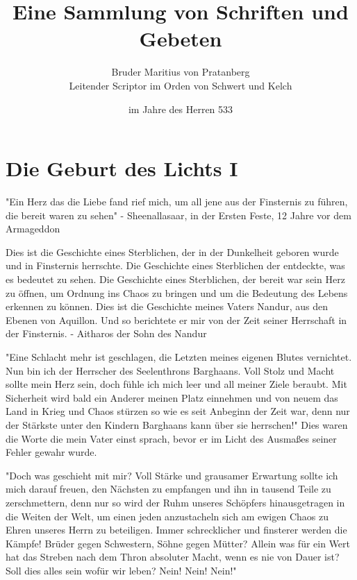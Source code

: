 \documentclass[10pt,twoside,BCOR=12mm,DIV=classic]{scrbook}
\begin{document}
\title{Eine Sammlung von Schriften und Gebeten}
\author{Bruder Maritius von Pratanberg\\Leitender Scriptor im Orden von Schwert und Kelch}
\date{im Jahre des Herren 533}

\maketitle
\tableofcontents

\chapter{Die Geburt des Lichts I}
"Ein Herz das die Liebe fand rief mich, um all jene aus der Finsternis zu führen,
die bereit waren zu sehen"
- Sheenallasaar, in der Ersten Feste, 12 Jahre vor dem Armageddon

Dies ist die Geschichte eines Sterblichen, der in der Dunkelheit geboren wurde
und in Finsternis herrschte. Die Geschichte eines Sterblichen der entdeckte, was
es bedeutet zu sehen. Die Geschichte eines Sterblichen, der bereit war sein
Herz zu öffnen, um Ordnung ins Chaos zu bringen und um die Bedeutung des
Lebens erkennen zu können. Dies ist die Geschichte meines Vaters Nandur, aus
den Ebenen von Aquillon. Und so berichtete er mir von der Zeit seiner
Herrschaft in der Finsternis.
- Aitharos der Sohn des Nandur

"Eine Schlacht mehr ist geschlagen, die Letzten meines eigenen Blutes
vernichtet. Nun bin ich der Herrscher des Seelenthrons Barghaans. Voll Stolz
und Macht sollte mein Herz sein, doch fühle ich mich leer und all meiner Ziele
beraubt. Mit Sicherheit wird bald ein Anderer meinen Platz einnehmen und von
neuem das Land in Krieg und Chaos stürzen so wie es seit Anbeginn der Zeit war,
denn nur der Stärkste unter den Kindern Barghaans kann über sie herrschen!" Dies
waren die Worte die mein Vater einst sprach, bevor er im Licht des Ausmaßes
seiner Fehler gewahr wurde.

"Doch was geschieht mit mir? Voll Stärke und grausamer Erwartung sollte ich mich
darauf freuen, den Nächsten zu empfangen und ihn in tausend Teile zu
zerschmettern, denn nur so wird der Ruhm unseres Schöpfers hinausgetragen in die
Weiten der Welt, um einen jeden anzustacheln sich am ewigen Chaos zu Ehren
unseres Herrn zu beteiligen. Immer schrecklicher und finsterer werden die
Kämpfe! Brüder gegen Schwestern, Söhne gegen Mütter? Allein was für ein Wert hat
das Streben nach dem Thron absoluter Macht, wenn es nie von Dauer ist?
Soll dies alles sein wofür wir leben?
Nein! Nein! Nein!"
\end{document}

